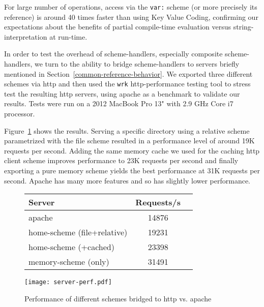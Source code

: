 \documentclass[preprint]{sigplanconf}
\begin{document}
For large number of operations, access via the {\tt var:} scheme (or more precisely its reference) is
around 40 times faster than using Key Value Coding, confirming our expectations about the benefits
of partial compile-time evaluation versus string-interpretation at run-time.  

In order to test the overhead of scheme-handlers, especially composite scheme-handlers, we turn
to the ability to bridge scheme-handlers to servers briefly mentioned in Section~\ref{common-reference-behavior}.
We exported three different schemes via http and then used the {\tt wrk} http-performance testing tool to stress
test the resulting http servers, using apache as a benchmark to validate our results.  Tests were run on a 2012 MacBook Pro 13" with 2.9 GHz Core i7 processor.

Figure~\ref{http-server-speed} shows the results.  Serving a specific directory using a relative scheme parametrized
with the file scheme resulted in a performance level of around 19K requests per second.  Adding the same memory cache
we used for the caching http client scheme improves performance to 23K requests per second and finally exporting a pure
memory scheme yields the best performance at 31K requests per second.   Apache has many more features and so
has slightly lower performance.

\begin{figure}
\begin{minipage}[c]{0.58\textwidth}
\begin{tabular}{|l|c|c|} \hline
Server   &  Requests/s    \\ \hline
apache & 	14876	      \\ %
home-scheme (file+relative) &  19231   \\ %
home-scheme (+cached)  &  23398  \\ %
memory-scheme (only) &  31491  \\ \hline
\end{tabular}
\end{minipage}
\begin{minipage}[c]{0.58\textwidth}
\texttt{[image: server-perf.pdf]}
\end{minipage}
\vspace{-2.0em}
\caption{Performance of different schemes bridged to http vs. apache}
\label{http-server-speed}
\end{figure}



\end{document}
